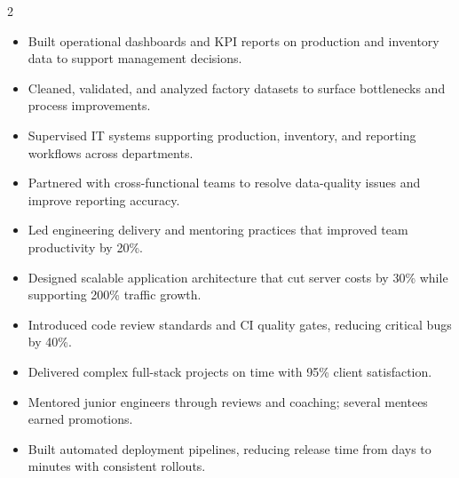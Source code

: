 \documentclass[10pt,a4paper,ragged2e,withhyper]{altacv}
\begin{document}
\begin{paracol}{2}



\begin{itemize}
\item Built operational dashboards and KPI reports on production and inventory data to support management decisions.

\item Cleaned, validated, and analyzed factory datasets to surface bottlenecks and process improvements.

\item Supervised IT systems supporting production, inventory, and reporting workflows across departments.

\item Partnered with cross-functional teams to resolve data-quality issues and improve reporting accuracy.
\end{itemize}

\divider


\begin{itemize}
\item Led engineering delivery and mentoring practices that improved team productivity by 20\%.

\item Designed scalable application architecture that cut server costs by 30\% while supporting 200\% traffic growth.

\item Introduced code review standards and CI quality gates, reducing critical bugs by 40\%.

\item Delivered complex full-stack projects on time with 95\% client satisfaction.

\item Mentored junior engineers through reviews and coaching; several mentees earned promotions.
\end{itemize}

\divider

\begin{itemize}
\item Built automated deployment pipelines, reducing release time from days to minutes with consistent rollouts.


\end{itemize}
\end{paracol}
\end{document}

